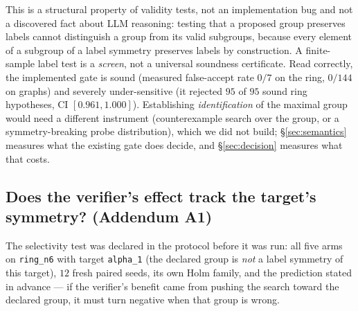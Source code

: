 \documentclass[11pt]{article}
\begin{document}
This is a structural property of validity tests, not an implementation bug and not a
discovered fact about LLM reasoning: testing that a proposed group preserves labels cannot
distinguish a group from its valid subgroups, because every element of a subgroup of a label
symmetry preserves labels by construction. A finite-sample label test is a \emph{screen}, not
a universal soundness certificate. Read correctly, the implemented gate is sound (measured
false-accept rate $0/7$ on the ring, $0/144$ on graphs) and severely under-sensitive (it
rejected $95$ of $95$ sound ring hypotheses, CI $[0.961,1.000]$). Establishing
\emph{identification} of the maximal group would need a different instrument (counterexample
search over the group, or a symmetry-breaking probe distribution), which we did not build;
\S\ref{sec:semantics} measures what the existing gate does decide, and \S\ref{sec:decision}
measures what that costs.

\subsection{Does the verifier's effect track the target's symmetry? (Addendum A1)}
\label{sec:breaking}

The selectivity test was declared in the protocol before it was run: all five arms on
\texttt{ring\_n6} with target \texttt{alpha\_1} (the declared group is \emph{not} a label
symmetry of this target), $12$ fresh paired seeds, its own Holm family, and the prediction
stated in advance --- if the verifier's benefit came from pushing the search toward the
declared group, it must turn negative when that group is wrong.
\end{document}
